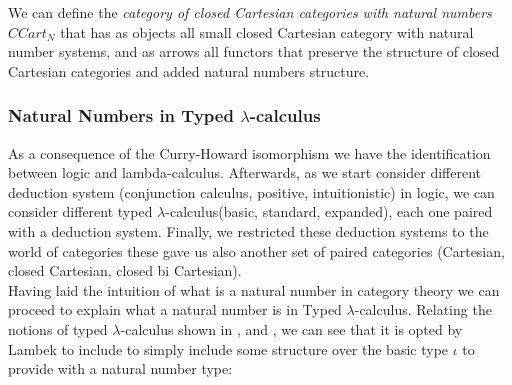 \begin{definition}
  We can define the \emph{category of closed Cartesian categories with natural numbers} $CCart_N$ that has as objects all small closed Cartesian category with natural number systems, and as arrows all functors that preserve the structure of closed Cartesian categories and added natural numbers structure.\\
\end{definition}


\subsubsection{Natural Numbers in Typed $\lambda$-calculus}\label{section:natural-revisited}

As a consequence of the Curry-Howard isomorphism we have the identification between logic and lambda-calculus. Afterwards, as we start consider different deduction system  (conjunction calculus, positive, intuitionistic) in logic, we can consider different typed $\lambda$-calculus(basic, standard, expanded), each one paired with a deduction system. Finally, we restricted these deduction systems to the world of categories these gave us also another set of paired categories (Cartesian, closed Cartesian, closed bi Cartesian). \\



Having laid the intuition of what is a natural number in category theory we can proceed to explain what a natural number is in Typed $\lambda$-calculus. Relating the notions of typed $\lambda$-calculus shown in \cite[Section 10]{lambek1988introduction}, \cite[Section 6]{selinger2008lecture} and \cite[Section 10]{cardone2006history}, we can see that it is opted by Lambek to include to simply include some structure over the basic type $\iota$  to provide with a natural number type:

